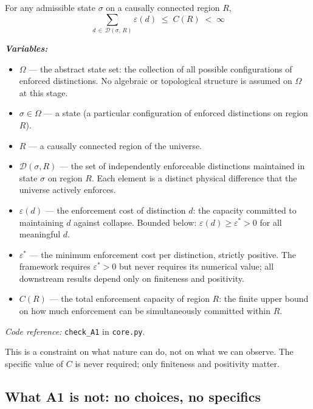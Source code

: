\documentclass[11pt]{article}
\newenvironment{varlist}{\begin{itemize}[nosep,leftmargin=2em]}{\end{itemize}}
\newcommand{\coderef}[2]{\smallskip\noindent\textit{Code reference:} \texttt{#1} in \texttt{#2}.}
\begin{document}
\begin{tcolorbox}[apfbox, title={Axiom A1 (Finite Enforcement Capacity)}]
For any admissible state $\sigma$ on a causally connected region $R$,
\begin{equation}
\sum_{d \,\in\, \mathcal{D}(\sigma,\,R)} \varepsilon(d) \;\le\; C(R) \;<\; \infty
\end{equation}

\smallskip\noindent\textbf{\textit{Variables:}}
\begin{varlist}
\item $\Omega$ --- the abstract state set: the collection of all possible configurations of enforced distinctions.  No algebraic or topological structure is assumed on $\Omega$ at this stage.
\item $\sigma \in \Omega$ --- a state (a particular configuration of enforced distinctions on region $R$).
\item $R$ --- a causally connected region of the universe.
\item $\mathcal{D}(\sigma,R)$ --- the set of independently enforceable distinctions maintained in state $\sigma$ on region $R$.  Each element is a distinct physical difference that the universe actively enforces.
\item $\varepsilon(d)$ --- the enforcement cost of distinction $d$: the capacity committed to maintaining $d$ against collapse.  Bounded below: $\varepsilon(d) \ge \varepsilon^* > 0$ for all meaningful $d$.
\item $\varepsilon^*$ --- the minimum enforcement cost per distinction, strictly positive.  The framework requires $\varepsilon^* > 0$ but never requires its numerical value; all downstream results depend only on finiteness and positivity.
\item $C(R)$ --- the total enforcement capacity of region $R$: the finite upper bound on how much enforcement can be simultaneously committed within $R$.
\end{varlist}

\coderef{check\_A1}{core.py}
\end{tcolorbox}

This is a constraint on what nature can do, not on what we can observe.  The specific value of $C$ is never required; only finiteness and positivity matter.

\subsection{What A1 is not: no choices, no specifics}
\end{document}
